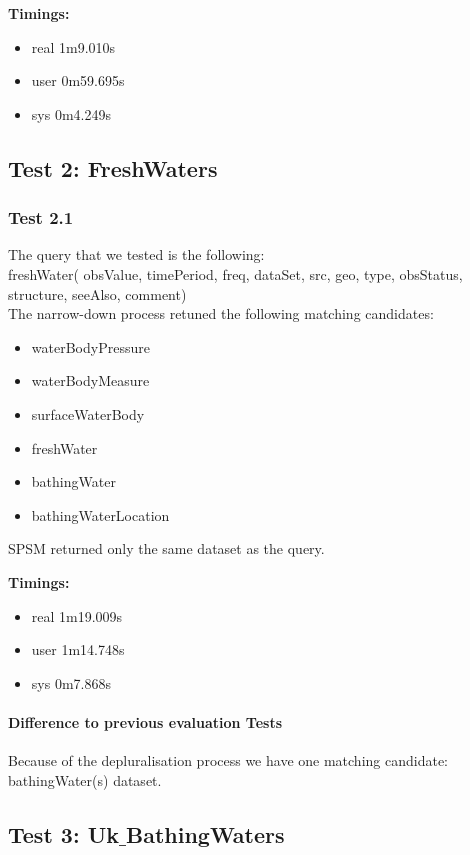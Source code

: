 \documentclass[a4paper,10pt]{article}
\begin{document}
\textbf{Timings:}
\begin{itemize}
\item real	1m9.010s
\item user	0m59.695s
\item sys	0m4.249s

\end{itemize}
\subsection{Test 2: FreshWaters }

\subsubsection{Test 2.1} The query that we tested is the following:\\
\indent freshWater(  obsValue, timePeriod, freq, dataSet, src, geo, type, obsStatus, structure, seeAlso, comment)\\
The narrow-down process retuned the following matching candidates: 


\begin{itemize}
\item waterBodyPressure
\item waterBodyMeasure
\item surfaceWaterBody
\item freshWater
\item bathingWater
\item bathingWaterLocation

\end{itemize}
SPSM returned only the same dataset as the query.

\textbf{Timings:}
\begin{itemize}
\item real	1m19.009s
\item user	1m14.748s
\item sys	0m7.868s

\end{itemize}


\paragraph{Difference to previous evaluation Tests}
Because of the depluralisation process we have one matching candidate: bathingWater(s) dataset.


\subsection{Test 3: Uk$\_$BathingWaters }
\end{document}
